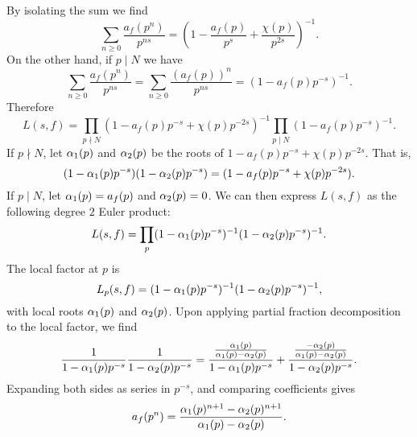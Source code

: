       By isolating the sum we find
      \[
        \sum_{n \ge 0}\frac{a_{f}(p^{n})}{p^{ns}} = \left(1-\frac{a_{f}(p)}{p^{s}}+\frac{\chi(p)}{p^{2s}}\right)^{-1}.
      \]
      On the other hand, if $p \mid N$ we have
      \[
        \sum_{n \ge 0}\frac{a_{f}(p^{n})}{p^{ns}} = \sum_{n \ge 0}\frac{(a_{f}(p))^{n}}{p^{ns}} = \left(1-a_{f}(p)p^{-s}\right)^{-1}.
      \]
      Therefore
      \[
        L(s,f) = \prod_{p \nmid N}(1-a_{f}(p)p^{-s}+\chi(p)p^{-2s})^{-1}\prod_{p \mid N}(1-a_{f}(p)p^{-s})^{-1}.
      \]
      If $p \nmid N$, let $\alpha_{1}(p)$ and $\alpha_{2}(p)$ be the roots of $1-a_{f}(p)p^{-s}+\chi(p)p^{-2s}$. That is,
      \[
        (1-\alpha_{1}(p)p^{-s})(1-\alpha_{2}(p)p^{-s}) = (1-a_{f}(p)p^{-s}+\chi(p)p^{-2s}).
      \]
      If $p \mid N$, let $\alpha_{1}(p) = a_{f}(p)$ and $\alpha_{2}(p) = 0$. We can then express $L(s,f)$ as the following degree $2$ Euler product:
      \[
        L(s,f) = \prod_{p}(1-\alpha_{1}(p)p^{-s})^{-1}(1-\alpha_{2}(p)p^{-s})^{-1}.
      \]
      The local factor at $p$ is 
      \[
        L_{p}(s,f) = (1-\alpha_{1}(p)p^{-s})^{-1}(1-\alpha_{2}(p)p^{-s})^{-1},
      \]
      with local roots $\alpha_{1}(p)$ and $\alpha_{2}(p)$. Upon applying partial fraction decomposition to the local factor, we find
      \[
        \frac{1}{1-\alpha_{1}(p)p^{-s}}\frac{1}{1-\alpha_{2}(p)p^{-s}} = \frac{\frac{\alpha_{1}(p)}{\alpha_{1}(p)-\alpha_{2}(p)}}{1-\alpha_{1}(p)p^{-s}}+\frac{\frac{-\alpha_{2}(p)}{\alpha_{1}(p)-\alpha_{2}(p)}}{1-\alpha_{2}(p)p^{-s}}.
      \]
      Expanding both sides as series in $p^{-s}$, and comparing coefficients gives
      \begin{equation}\label{equ:Hecke_L_function_coefficient_formula}
        a_{f}(p^{n}) = \frac{\alpha_{1}(p)^{n+1}-\alpha_{2}(p)^{n+1}}{\alpha_{1}(p)-\alpha_{2}(p)}.
      \end{equation}
